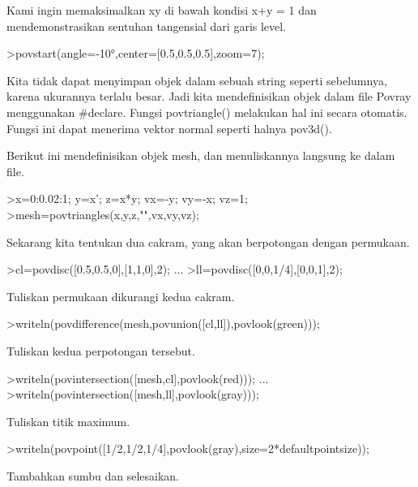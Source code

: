 \documentclass[a4paper,10pt]{article}
\begin{document}
\begin{eulernotebook}
\begin{eulercomment}
\begin{eulercomment}
\begin{eulercomment}
\begin{eulercomment}
\begin{eulercomment}
\begin{eulercomment}
\begin{eulercomment}
\begin{eulercomment}
\begin{eulercomment}
\begin{eulercomment}
\begin{eulercomment}
Kami ingin memaksimalkan xy di bawah kondisi x+y = 1 dan
mendemonstrasikan sentuhan tangensial dari garis level.
\end{eulercomment}
\begin{eulerprompt}
>povstart(angle=-10°,center=[0.5,0.5,0.5],zoom=7);
\end{eulerprompt}
\begin{eulercomment}
Kita tidak dapat menyimpan objek dalam sebuah string seperti
sebelumnya, karena ukurannya terlalu besar. Jadi kita mendefinisikan
objek dalam file Povray menggunakan #declare. Fungsi povtriangle()
melakukan hal ini secara otomatis. Fungsi ini dapat menerima vektor
normal seperti halnya pov3d().

Berikut ini mendefinisikan objek mesh, dan menuliskannya langsung ke
dalam file.
\end{eulercomment}
\begin{eulerprompt}
>x=0:0.02:1; y=x'; z=x*y; vx=-y; vy=-x; vz=1;
>mesh=povtriangles(x,y,z,"",vx,vy,vz);
\end{eulerprompt}
\begin{eulercomment}
Sekarang kita tentukan dua cakram, yang akan berpotongan dengan
permukaan.
\end{eulercomment}
\begin{eulerprompt}
>cl=povdisc([0.5,0.5,0],[1,1,0],2); ...
>ll=povdisc([0,0,1/4],[0,0,1],2);
\end{eulerprompt}
\begin{eulercomment}
Tuliskan permukaan dikurangi kedua cakram.
\end{eulercomment}
\begin{eulerprompt}
>writeln(povdifference(mesh,povunion([cl,ll]),povlook(green)));
\end{eulerprompt}
\begin{eulercomment}
Tuliskan kedua perpotongan tersebut.
\end{eulercomment}
\begin{eulerprompt}
>writeln(povintersection([mesh,cl],povlook(red))); ...
>writeln(povintersection([mesh,ll],povlook(gray)));
\end{eulerprompt}
\begin{eulercomment}
Tuliskan titik maximum.
\end{eulercomment}
\begin{eulerprompt}
>writeln(povpoint([1/2,1/2,1/4],povlook(gray),size=2*defaultpointsize));
\end{eulerprompt}
\begin{eulercomment}
Tambahkan sumbu dan selesaikan.

\end{eulercomment}
\end{eulercomment}
\end{eulercomment}
\end{eulercomment}
\end{eulercomment}
\end{eulercomment}
\end{eulercomment}
\end{eulercomment}
\end{eulercomment}
\end{eulercomment}
\end{eulercomment}
\end{eulernotebook}
\end{document}
